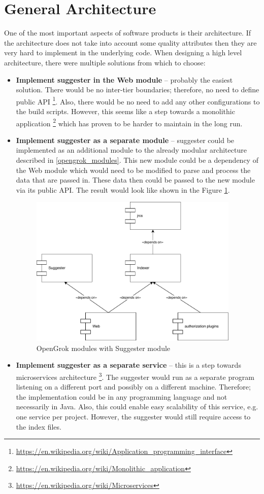 \section{General Architecture}
\label{general_architecture}
One of the most important aspects of software products is their architecture. If the architecture does not take into account some
quality attributes then they are very hard to implement in the underlying code. When designing a high level architecture,
there were multiple solutions from which to choose:
\begin{itemize}
    \item \textbf{Implement suggester in the Web module} – probably the easiest solution. There would be no inter-tier
    boundaries; therefore, no need to define public API
    \footnote{\url{https://en.wikipedia.org/wiki/Application\_programming\_interface}}. Also, there would be no need
    to add any other configurations to the build scripts. However, this seems like a step towards a monolithic application
    \footnote{\url{https://en.wikipedia.org/wiki/Monolithic\_application}} which has proven to be harder to maintain in the
    long run.
    \item \textbf{Implement suggester as a separate module} – suggester could be implemented as an additional module to
    the already modular architecture described in \ref{opengrok_modules}. This new module could be a dependency of the Web
    module which would need to be modified to parse and process the data that are passed in. These data then could be
    passed to the new module via its public API. The result would look like shown in the Figure \ref{opengrok_modules_changed_img}.
    \begin{figure}[htbp]
    \centering
    \includegraphics[width=100mm]{../img/opengrok_modules_changed.pdf}
    \caption{OpenGrok modules with Suggester module}
    \label{opengrok_modules_changed_img}
    \end{figure}
    \item \textbf{Implement suggester as a separate service} – this is a step towards microservices architecture
    \footnote{\url{https://en.wikipedia.org/wiki/Microservices}}. The suggester would run as a separate program
    listening on a different port and possibly on a different machine. Therefore; the implementation could be in any
    programming language and not necessarily in Java. Also, this could enable easy scalability of this service,
    e.g. one service per project. However, the suggester would still require access to the index files.
\end{itemize}

